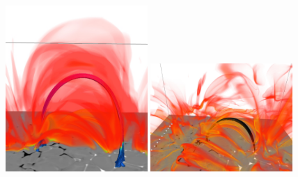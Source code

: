 \documentclass{aa}
\begin{document}
{\begin{figure}[!h]
\sidecaption
\begin{minipage}{12cm}
\vspace{-7cm}
\includegraphics[width=0.48\textwidth]{figures2/lines_with_logTcol_o6emiss_zoom_0000.pdf}
\includegraphics[width=0.48\textwidth]{figures2/lowlines_low_and_c4emiss_coaligned_side3_black.pdf}

\end{minipage}
\end{figure}}
\end{document}
